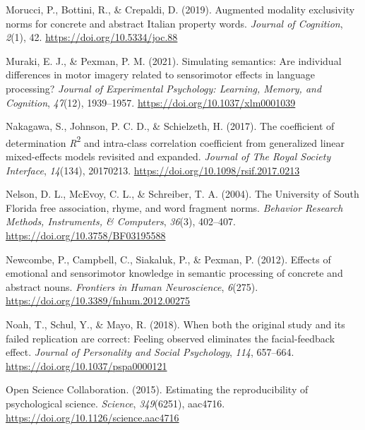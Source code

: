 \documentclass[
  12pt,
  man,floatsintext]{apa7}
\newlength{\cslhangindent}
\newlength{\cslentryspacingunit} %
\newenvironment{CSLReferences}[2] %
 {%
  \setlength{\parindent}{0pt}
  \ifodd #1
  \let\oldpar\par
  \def\par{\hangindent=\cslhangindent\oldpar}
  \fi
  \setlength{\parskip}{#2\cslentryspacingunit}
 }%
 {}
\begin{document}
\begin{CSLReferences}{1}{0}
\leavevmode{}%
Morucci, P., Bottini, R., \& Crepaldi, D. (2019). Augmented modality exclusivity norms for concrete and abstract {Italian} property words. \emph{Journal of Cognition}, \emph{2}(1), 42. \url{https://doi.org/10.5334/joc.88}

\leavevmode{}%
Muraki, E. J., \& Pexman, P. M. (2021). Simulating semantics: {Are} individual differences in motor imagery related to sensorimotor effects in language processing? \emph{Journal of Experimental Psychology: Learning, Memory, and Cognition}, \emph{47}(12), 1939--1957. \url{https://doi.org/10.1037/xlm0001039}

\leavevmode{}%
Nakagawa, S., Johnson, P. C. D., \& Schielzeth, H. (2017). The coefficient of determination {\emph{R}}{\textsuperscript{2}} and intra-class correlation coefficient from generalized linear mixed-effects models revisited and expanded. \emph{Journal of The Royal Society Interface}, \emph{14}(134), 20170213. \url{https://doi.org/10.1098/rsif.2017.0213}

\leavevmode{}%
Nelson, D. L., McEvoy, C. L., \& Schreiber, T. A. (2004). The {University} of {South Florida} free association, rhyme, and word fragment norms. \emph{Behavior Research Methods, Instruments, \& Computers}, \emph{36}(3), 402--407. \url{https://doi.org/10.3758/BF03195588}

\leavevmode{}%
Newcombe, P., Campbell, C., Siakaluk, P., \& Pexman, P. (2012). Effects of emotional and sensorimotor knowledge in semantic processing of concrete and abstract nouns. \emph{Frontiers in Human Neuroscience}, \emph{6}(275). \url{https://doi.org/10.3389/fnhum.2012.00275}

\leavevmode{}%
Noah, T., Schul, Y., \& Mayo, R. (2018). When both the original study and its failed replication are correct: {Feeling} observed eliminates the facial-feedback effect. \emph{Journal of Personality and Social Psychology}, \emph{114}, 657--664. \url{https://doi.org/10.1037/pspa0000121}

\leavevmode{}%
Open Science Collaboration. (2015). Estimating the reproducibility of psychological science. \emph{Science}, \emph{349}(6251), aac4716. \url{https://doi.org/10.1126/science.aac4716}


\end{CSLReferences}
\end{document}
